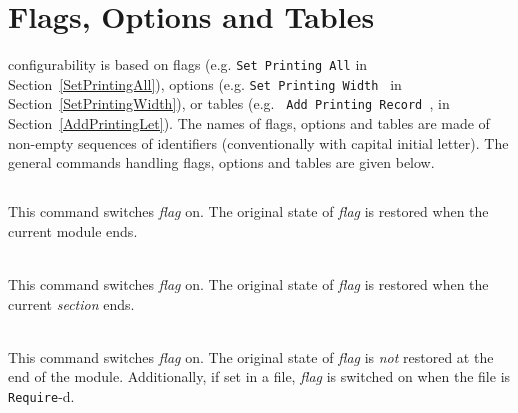 
\section{Flags, Options and Tables}

{\Coq} configurability is based on flags (e.g. {\tt Set Printing All} in
Section~\ref{SetPrintingAll}), options (e.g. {\tt Set Printing Width
  {\integer}} in Section~\ref{SetPrintingWidth}), or tables (e.g. {\tt
  Add Printing Record {\ident}}, in Section~\ref{AddPrintingLet}). The
names of flags, options and tables are made of non-empty sequences of
identifiers (conventionally with capital initial letter). The general
commands handling flags, options and tables are given below.

\subsection[\tt Set {\rm\sl flag}.]{}
This command switches {\rm\sl flag} on. The original state of
{\rm\sl flag} is restored when the current module ends.

\begin{Variants}
\item {}\\
This command switches {\rm\sl flag} on. The original state of
{\rm\sl flag} is restored when the current \emph{section} ends.
\item {}\\
This command switches {\rm\sl flag} on. The original state of
{\rm\sl flag} is \emph{not} restored at the end of the module. Additionally,
if set in a file, {\rm\sl flag} is switched on when the file is
{\tt Require}-d.
\end{Variants}

